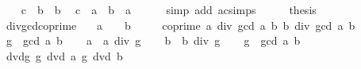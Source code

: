 \begin{isabellebody}
\isanewline
\ \ \isamarkupfalse%
\ {\isacartoucheopen}c\ {\isacharequal}{\kern0pt}\ b\ {\isacharasterisk}{\kern0pt}\ b{\isacharprime}{\kern0pt}{\isacartoucheclose}\ \isamarkupfalse%
\ {\isachardoublequoteopen}c\ {\isacharequal}{\kern0pt}\ {\isacharparenleft}{\kern0pt}a\ {\isacharasterisk}{\kern0pt}\ b{\isacharparenright}{\kern0pt}\ {\isacharasterisk}{\kern0pt}\ a{\isacharprime}{\kern0pt}{\isachardoublequoteclose}\isanewline
\ \ \ \ \isamarkupfalse%
\ {\isacharparenleft}{\kern0pt}simp\ add{\isacharcolon}{\kern0pt}\ ac{\isacharunderscore}{\kern0pt}simps{\isacharparenright}{\kern0pt}\isanewline
\ \ \isamarkupfalse%
\ \isamarkupfalse%
\ {\isacharquery}{\kern0pt}thesis\ \isacommand{{\isachardot}{\kern0pt}{\isachardot}{\kern0pt}}\isamarkupfalse%
\isanewline
{}\isamarkupfalse%
%
\endisatagproof
{\isafoldproof}%
%
\isadelimproof
\isanewline
%
\endisadelimproof
\isanewline
{}\isamarkupfalse%
\ div{\isacharunderscore}{\kern0pt}gcd{\isacharunderscore}{\kern0pt}coprime{\isacharcolon}{\kern0pt}\isanewline
\ \ \ {\isachardoublequoteopen}a\ {\isasymnoteq}\ {}\ {\isasymor}\ b\ {\isasymnoteq}\ {}{\isachardoublequoteclose}\isanewline
\ \ \ {\isachardoublequoteopen}coprime\ {\isacharparenleft}{\kern0pt}a\ div\ gcd\ a\ b{\isacharparenright}{\kern0pt}\ {\isacharparenleft}{\kern0pt}b\ div\ gcd\ a\ b{\isacharparenright}{\kern0pt}{\isachardoublequoteclose}\isanewline
%
\isadelimproof
%
\endisadelimproof
%
\isatagproof
{}\isamarkupfalse%
\ {\isacharminus}{\kern0pt}\isanewline
\ \ \isamarkupfalse%
\ {\isacharquery}{\kern0pt}g\ {\isacharequal}{\kern0pt}\ {\isachardoublequoteopen}gcd\ a\ b{\isachardoublequoteclose}\isanewline
\ \ \isamarkupfalse%
\ {\isacharquery}{\kern0pt}a{\isacharprime}{\kern0pt}\ {\isacharequal}{\kern0pt}\ {\isachardoublequoteopen}a\ div\ {\isacharquery}{\kern0pt}g{\isachardoublequoteclose}\isanewline
\ \ \isamarkupfalse%
\ {\isacharquery}{\kern0pt}b{\isacharprime}{\kern0pt}\ {\isacharequal}{\kern0pt}\ {\isachardoublequoteopen}b\ div\ {\isacharquery}{\kern0pt}g{\isachardoublequoteclose}\isanewline
\ \ \isamarkupfalse%
\ {\isacharquery}{\kern0pt}g{\isacharprime}{\kern0pt}\ {\isacharequal}{\kern0pt}\ {\isachardoublequoteopen}gcd\ {\isacharquery}{\kern0pt}a{\isacharprime}{\kern0pt}\ {\isacharquery}{\kern0pt}b{\isacharprime}{\kern0pt}{\isachardoublequoteclose}\isanewline
\ \ \isamarkupfalse%
\ dvdg{\isacharcolon}{\kern0pt}\ {\isachardoublequoteopen}{\isacharquery}{\kern0pt}g\ dvd\ a{\isachardoublequoteclose}\ {\isachardoublequoteopen}{\isacharquery}{\kern0pt}g\ dvd\ b{\isachardoublequoteclose}\isanewline

\end{isabellebody}
